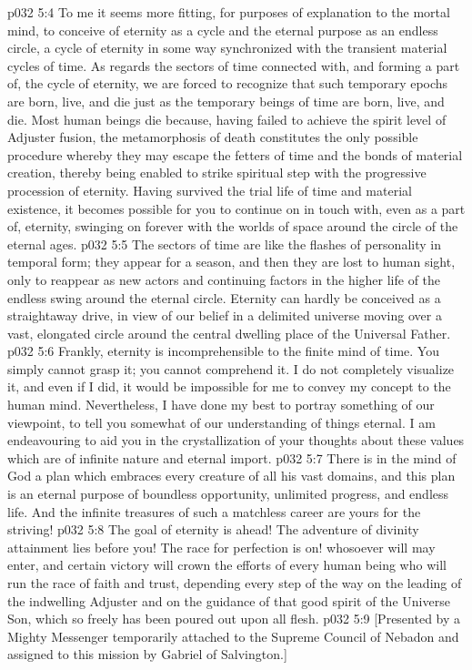 \vs p032 5:4 To me it seems more fitting, for purposes of explanation to the mortal mind, to conceive of eternity as a cycle and the eternal purpose as an endless circle, a cycle of eternity in some way synchronized with the transient material cycles of time. As regards the sectors of time connected with, and forming a part of, the cycle of eternity, we are forced to recognize that such temporary epochs are born, live, and die just as the temporary beings of time are born, live, and die. Most human beings die because, having failed to achieve the spirit level of Adjuster fusion, the metamorphosis of death constitutes the only possible procedure whereby they may escape the fetters of time and the bonds of material creation, thereby being enabled to strike spiritual step with the progressive procession of eternity. Having survived the trial life of time and material existence, it becomes possible for you to continue on in touch with, even as a part of, eternity, swinging on forever with the worlds of space around the circle of the eternal ages.
\vs p032 5:5 The sectors of time are like the flashes of personality in temporal form; they appear for a season, and then they are lost to human sight, only to reappear as new actors and continuing factors in the higher life of the endless swing around the eternal circle. Eternity can hardly be conceived as a straightaway drive, in view of our belief in a delimited universe moving over a vast, elongated circle around the central dwelling place of the Universal Father.
\vs p032 5:6 Frankly, eternity is incomprehensible to the finite mind of time. You simply cannot grasp it; you cannot comprehend it. I do not completely visualize it, and even if I did, it would be impossible for me to convey my concept to the human mind. Nevertheless, I have done my best to portray something of our viewpoint, to tell you somewhat of our understanding of things eternal. I am endeavouring to aid you in the crystallization of your thoughts about these values which are of infinite nature and eternal import.
\vs p032 5:7 \pc There is in the mind of God a plan which embraces every creature of all his vast domains, and this plan is an eternal purpose of boundless opportunity, unlimited progress, and endless life. And the infinite treasures of such a matchless career are yours for the striving!
\vs p032 5:8 The goal of eternity is ahead! The adventure of divinity attainment lies before you! The race for perfection is on! whosoever will may enter, and certain victory will crown the efforts of every human being who will run the race of faith and trust, depending every step of the way on the leading of the indwelling Adjuster and on the guidance of that good spirit of the Universe Son, which so freely has been poured out upon all flesh.
\vsetoff
\vs p032 5:9 [Presented by a Mighty Messenger temporarily attached to the Supreme Council of Nebadon and assigned to this mission by Gabriel of Salvington.]
\quizlink
